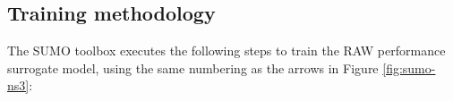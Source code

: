 \subsection{Training methodology \label{subs:raw_training}}




The SUMO toolbox executes the following steps to train the RAW performance surrogate model, using the same numbering as the arrows in Figure \ref{fig:sumo-ns3}:

